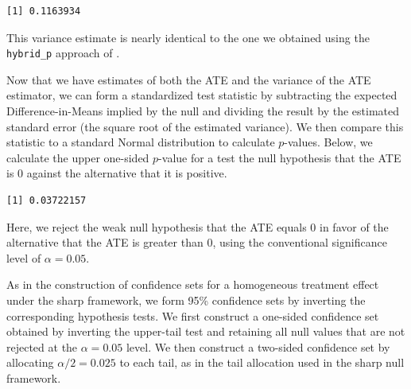 \documentclass[
  12pt,
  leqno]{article}
\newenvironment{Shaded}{\begin{snugshade}}{\end{snugshade}}
\newcommand{\AttributeTok}[1]{\textcolor[rgb]{0.13,0.29,0.53}{#1}}
\newcommand{\ConstantTok}[1]{\textcolor[rgb]{0.56,0.35,0.01}{#1}}
\newcommand{\DecValTok}[1]{\textcolor[rgb]{0.00,0.00,0.81}{#1}}
\newcommand{\FunctionTok}[1]{\textcolor[rgb]{0.13,0.29,0.53}{\textbf{#1}}}
\newcommand{\NormalTok}[1]{#1}
\newcommand{\SpecialCharTok}[1]{\textcolor[rgb]{0.81,0.36,0.00}{\textbf{#1}}}
\begin{document}
\begin{verbatim}
[1] 0.1163934
\end{verbatim}

\doublespacing

This variance estimate is nearly identical to the one we obtained using
the \texttt{hybrid\_p} approach of \citet{pashleymiratrix2021}.

Now that we have estimates of both the ATE and the variance of the ATE
estimator, we can form a standardized test statistic by subtracting the
expected Difference-in-Means implied by the null and dividing the result
by the estimated standard error (the square root of the estimated
variance). We then compare this statistic to a standard Normal
distribution to calculate \(p\)-values. Below, we calculate the upper
one-sided \(p\)-value for a test the null hypothesis that the ATE is
\(0\) against the alternative that it is positive.

\singlespacing

\begin{Shaded}
\end{Shaded}

\begin{verbatim}
[1] 0.03722157
\end{verbatim}

\doublespacing

Here, we reject the weak null hypothesis that the ATE equals \(0\) in
favor of the alternative that the ATE is greater than \(0\), using the
conventional significance level of \(\alpha = 0.05\).

As in the construction of confidence sets for a homogeneous treatment
effect under the sharp framework, we form 95\% confidence sets by
inverting the corresponding hypothesis tests. We first construct a
one-sided confidence set obtained by inverting the upper-tail test and
retaining all null values that are not rejected at the \(\alpha = 0.05\)
level. We then construct a two-sided confidence set by allocating
\(\alpha/2 = 0.025\) to each tail, as in the tail allocation used in the
sharp null framework.
\end{document}
